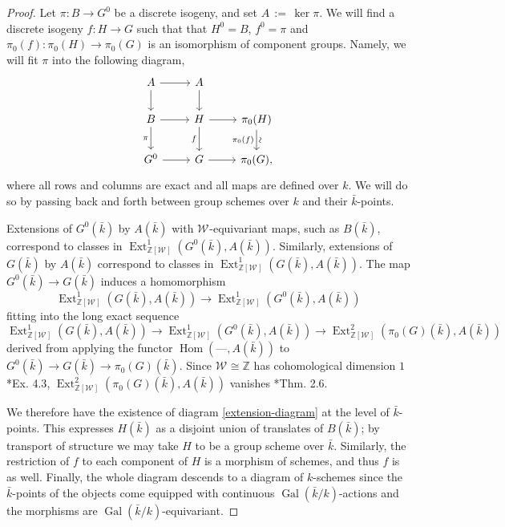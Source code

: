 \documentclass[10pt]{amsart}
\theoremstyle{plain}
\theoremstyle{definition}
\theoremstyle{remark}
\newcommand{\ZZ}{{\mathbb{Z}}}
\newcommand{\bFq}{\bar{k}}
\newcommand{\Fq}{k}
\newcommand{\Weil}[1]{\mathcal{W}_{#1}}
\DeclareMathOperator{\Gal}{Gal}
\DeclareMathOperator{\Hom}{Hom}
\DeclareMathOperator{\Ext}{Ext}
\newcommand{\ceq}{{\, :=\, }}
\begin{document}
\begin{proof}
Let $\pi: B \to G^0$ be a discrete isogeny, and set $A \ceq \ker \pi$.
  We will find a discrete isogeny $f: H\to G$
  such that that $H^0 = B$, $f^0 =\pi$ and
  $\pi_0(f) : \pi_0(H)\to \pi_0(G)$ is an isomorphism of component
  groups.  Namely, we will fit $\pi$ into the following diagram,
  \begin{equation}\label{extension-diagram}
  \begin{tikzcd}
  A \arrow{r} \dar & A \dar \\
  B \rar \dar[swap]{\pi} & H \rar \dar[swap]{f} & \pi_0(H) \arrow{d}[below,rotate=90]{\sim}[swap]{\pi_0(f)} \\
  G^0 \rar & G \rar & \pi_0(G),
  \end{tikzcd}
  \end{equation}
  where all rows and columns are exact and all maps are defined over
  $\Fq$.  We will do so by passing back and forth between group
  schemes over $\Fq$ and their $\bFq$-points.

  Extensions of $G^0(\bFq)$ by $A(\bFq)$ with $\Weil{}$-equivariant maps, such as $B(\bFq)$,
  correspond to classes in $\Ext^1_{\ZZ[\Weil{}]}(G^0(\bFq), A(\bFq))$.
  Similarly, extensions of $G(\bFq)$ by $A(\bFq)$ correspond to
  classes in $\Ext^1_{\ZZ[\Weil{}]}(G(\bFq), A(\bFq))$.  The map
  $G^0(\bFq) \to G(\bFq)$ induces a homomorphism
  \[
  \Ext^1_{\ZZ[\Weil{}]}(G(\bFq), A(\bFq)) \to \Ext^1_{\ZZ[\Weil{}]}(G^0(\bFq), A(\bFq))
  \]
  fitting into the long exact sequence 
  \[
  \Ext^1_{\ZZ[\Weil{}]}(G(\bFq), A(\bFq)) \to \Ext^1_{\ZZ[\Weil{}]}(G^0(\bFq), A(\bFq)) \to \Ext^2_{\ZZ[\Weil{}]}(\pi_0(G)(\bFq), A(\bFq))
  \]
  derived from applying
  the functor $\Hom(\mbox{---}, A(\bFq))$ to $G^0(\bFq) \to G(\bFq) \to \pi_0(G)(\bFq)$.
  Since $\Weil{} \cong \ZZ$ has cohomological dimension $1$ \cite{brown:CohomologyGrps}*{Ex. 4.3},
  $\Ext^2_{\ZZ[\Weil{}]}(\pi_0(G)(\bFq), A(\bFq))$ vanishes \cite{cartan-eilenberg:HomologicalAlgebra}*{Thm. 2.6}.

  We therefore have the existence of diagram \eqref{extension-diagram}
  at the level of $\bFq$-points.  This expresses $H(\bFq)$ as a
  disjoint union of translates of $B(\bFq)$; by transport of structure
  we may take $H$ to be a group scheme over $\bFq$.  Similarly, the
  restriction of $f$ to each component of $H$ is a morphism of
  schemes, and thus $f$ is as well.  Finally, the whole diagram
  descends to a diagram of $\Fq$-schemes since the $\bFq$-points of
  the objects come equipped with continuous $\Gal(\bFq/\Fq)$-actions and the
  morphisms are $\Gal(\bFq/\Fq)$-equivariant.
\end{proof}
\end{document}
